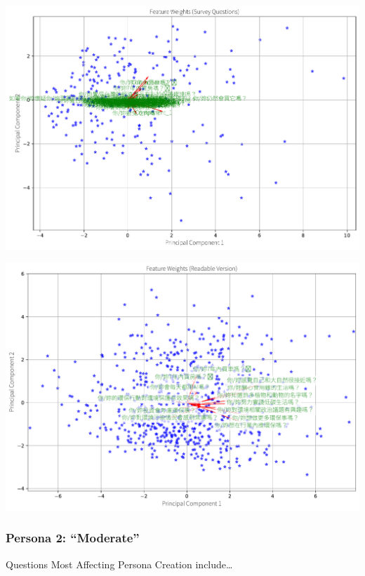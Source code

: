 \documentclass[
  letterpaper,
  DIV=11,
  numbers=noendperiod]{scrartcl}
\begin{document}
\includegraphics{_thesis_files/figure-pdf/cell-84-output-3.pdf}

\includegraphics{_thesis_files/figure-pdf/cell-84-output-4.pdf}

\subsubsection{Persona 2: ``Moderate''}\label{persona-2-moderate}

Questions Most Affecting Persona Creation include\ldots{}
\end{document}
